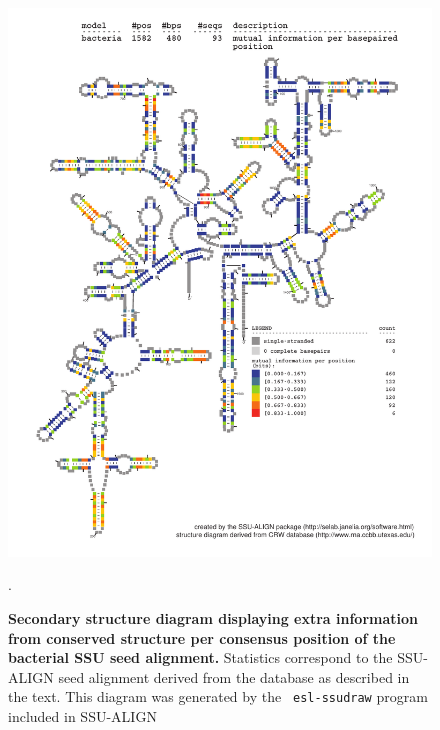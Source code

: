\begin{figure}
\begin{center}
\includegraphics[width=5.7in]{Figures/bacteria-0p1-mutinfo}
\end{center}
\caption[Secondary structure diagram displaying extra information 
  from conserved structure per consensus position of the bacterial SSU seed
  alignment]{\textbf{Secondary structure diagram displaying extra
  information from conserved structure per consensus position of the bacterial SSU seed
  alignment.} Statistics correspond to the SSU-ALIGN seed
  alignment derived from the  database \cite{CannoneGutell02}
  as described in the text. This diagram was generated by the {\tt
  esl-ssudraw} program included in SSU-ALIGN}.
\label{fig:bacsinfo}
\end{figure}


